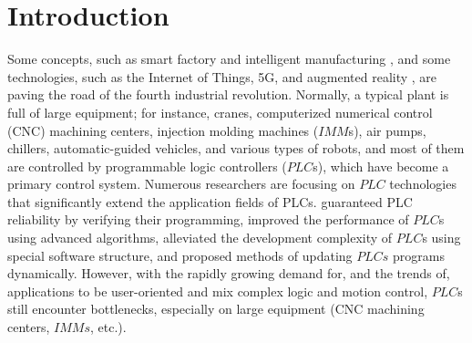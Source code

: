 \documentclass[journal,UTF8]{IEEEtran}
\begin{document}
	\IEEEpeerreviewmaketitle
	
	
	
	\section{Introduction}
	Some concepts, such as smart factory and intelligent manufacturing \cite{Gonzalez2017Supervisory,Chekired2018Industrial}, and some technologies, such as the Internet of Things, 5G, and augmented reality \cite{Li2018Energy,Ling20185G}, are paving the road of the fourth industrial revolution. Normally, a typical plant is full of large equipment; for instance, cranes, computerized numerical control (CNC) machining centers, injection molding machines ($IMM$s), air pumps, chillers, automatic-guided vehicles, and various types of robots, and most of them are controlled by programmable logic controllers ($PLC$s), which have become a primary control system. Numerous researchers are focusing on $PLC$ technologies that significantly extend the application fields of PLCs. \cite{Jiang2013System,Jiang2013Bayesian,Adiego2015Applying} guaranteed PLC reliability by verifying their programming, \cite{Gerk2006Advanced,Chang2007Adaptive,Dominic2016PLC} improved the performance of $PLC$s using advanced algorithms, \cite{WuA} alleviated the development complexity of $PLC$s using special software structure, and \cite{Sch2013Development,Morenas2017Shop} proposed methods of updating $PLCs$ programs dynamically.
	However, with the rapidly growing demand for, and the trends of, applications to be user-oriented and mix complex logic and motion control\cite{Zaeh2005A,Hossain2014Advanced}, $PLC$s still encounter bottlenecks, especially on large equipment (CNC machining centers, $IMMs$, etc.).
	
\end{document}
